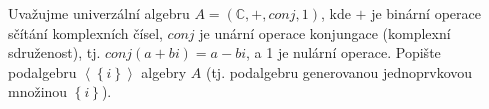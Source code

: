 \subsubsection{}
Uvažujme univerzální algebru $A = (\mathbb{C}, +, conj,1)$, kde $+$ je binární
operace sčítání komplexních čísel, $conj$ je unární
operace konjungace (komplexní sdruženost), tj. $conj(a + bi) = a - bi$, a 1 je
nulární operace. Popište podalgebru $\left \langle \left \{ i \right \} \right
\rangle$ algebry $A$ (tj. podalgebru generovanou jednoprvkovou množinou $\left \{ i \right \} $).
